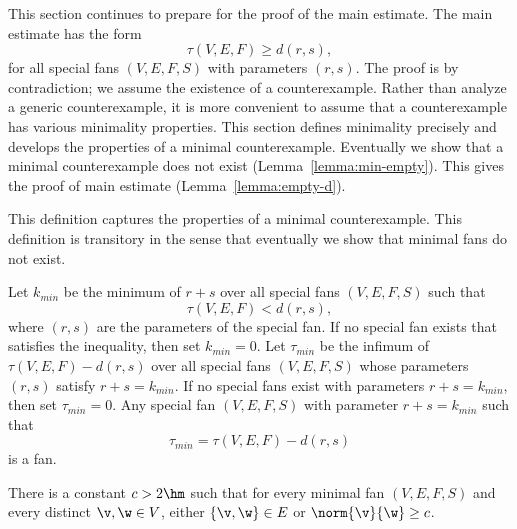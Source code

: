This section continues to prepare for the proof of the main estimate.
The main estimate has the form
\[
\tau(V,E,F) \ge d(r,s),
\]
for all special fans $(V,E,F,S)$ with parameters $(r,s)$.  The proof
is by contradiction; we assume the existence of a counterexample.
Rather than analyze a generic counterexample, it is more convenient to
assume that a counterexample has various minimality properties.  This
section defines minimality precisely and develops the properties of a
minimal counterexample.  Eventually we show that a minimal
counterexample does not exist (Lemma~\ref{lemma:min-empty}).  This
gives the proof of main estimate (Lemma~\ref{lemma:empty-d}).


This definition captures the properties of a minimal counterexample.
This definition is transitory in the sense that eventually we show
that minimal fans do not exist.

\begin{definition}
Let $k_{min}$ be the minimum of $r+s$ over
all special fans $(V,E,F,S)$ such that 
\begin{equation}\label{eqn:kmin}
\tau(V,E,F) < d (r,s),
\end{equation}
where $(r,s)$ are the parameters of the special fan.  If no special
fan exists that satisfies the inequality, then set $k_{min}=0$.  Let
$\tau_{min}$ be the infimum of $\tau(V,E,F)-d(r,s)$ over all special
fans $(V,E,F,S)$ whose parameters $(r,s)$ satisfy $r+s=k_{min}$.  If
no special fans exist with parameters $r+s=k_{min}$, then set
$\tau_{min}=0$.  Any special fan $(V,E,F,S)$ with parameter
$r+s=k_{min}$ such that
\begin{displaymath}
\tau_{min}= \tau(V,E,F)-d(r,s)
\end{displaymath}
is a  fan.
\end{definition}


\begin{lemma}[]\label{lemma:c-bound}
There is a constant $c>2\hm$ such that for every minimal fan
$(V,E,F,S)$ and every distinct $\v,\w\in V$, either $\{\v,\w\}\in E$
or $\norm{\v}{\w}\ge c$.
\end{lemma}

